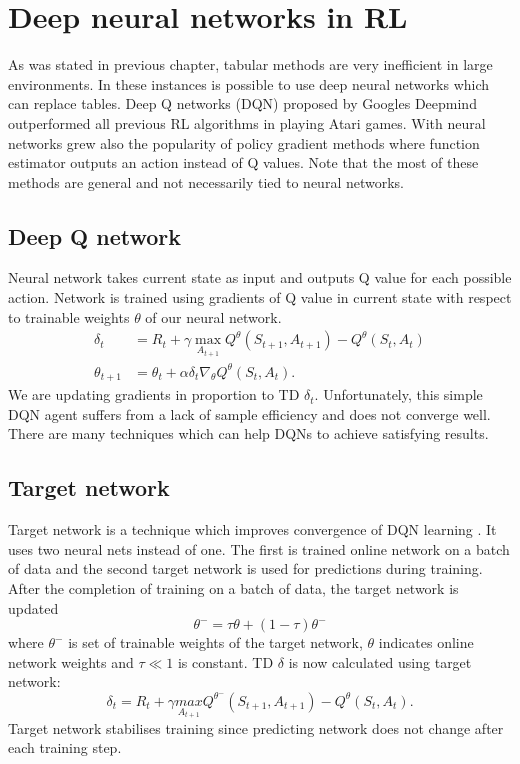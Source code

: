\clearpage
\section{Deep neural networks in RL}
As was stated in previous chapter, tabular methods are very inefficient in large environments. In these instances is possible to use deep neural networks which can replace tables. Deep Q networks (DQN) proposed by Googles Deepmind \cite{mnih2015} outperformed all previous RL algorithms in playing Atari games. With neural networks grew also the popularity of policy gradient methods where function estimator outputs an action instead of Q values. Note that the most of these methods are general and not necessarily tied to neural networks.

\subsection{Deep Q network}
Neural network takes current state as input and outputs Q value for each possible action. Network is trained using gradients of Q value in current state with respect to trainable weights $\theta$ of our neural network.
\begin{align}
\delta_t &= R_{t} + \gamma \underset{A_{t+1}}{\max}Q^\theta(S_{t+1}, A_{t+1}) - Q^\theta(S_t, A_t)\\
\theta_{t+1} &= \theta_t + \alpha \delta_t \nabla_\theta Q^\theta (S_t, A_t).
\end{align}
We are updating gradients in proportion to TD $\delta_t$. Unfortunately, this simple DQN agent suffers from a lack of sample efficiency and does not converge well. There are many techniques which can help DQNs to achieve satisfying results.

\subsection{Target network}
Target network is a technique which improves convergence of DQN learning \cite{mnih2015}. It uses two neural nets instead of one. The first is trained online network on a batch of data and the second target network is used for predictions during training. After the completion of training on a batch of data, the target network is updated
\begin{equation}
\theta^- = \tau \theta + (1-\tau)\theta^-
\end{equation}
where $\theta^-$ is set of trainable weights of the target network, $\theta$ indicates online network weights and $\tau \ll 1$ is constant.
TD $\delta$ is now calculated using target network:
\begin{equation}
\delta_t = R_{t} + \gamma \underset{A_{t+1}}{max}Q^{\theta^-}(S_{t+1}, A_{t+1}) - Q^\theta(S_t, A_t). 
\end{equation}
Target network stabilises training since predicting network does not change after each training step.

